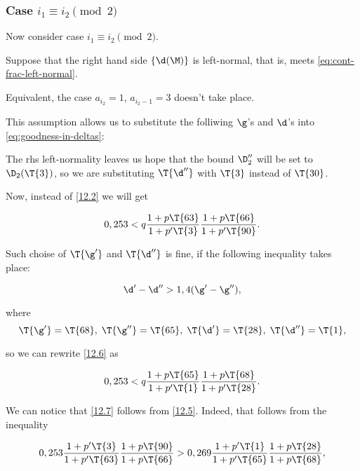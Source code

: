 \subsubsection{Case $i_1 \equiv i_2 \pmod 2$}

Now consider case $i_1 \equiv i_2 \pmod 2$.

Suppose that the right hand side $\{\d(\M)\}$ is left-normal,
that is, meets \ref{eq:cont-frac-left-normal}.

Equivalent, the case $a_{i_2} = 1$, $a_{i_2 - 1} = 3$ doesn't take place.


This assumption allows us to substitute the folliwing $\g$'s and $\d$'s
into \ref{eq:goodness-in-deltas}:
%

The rhs left-normality leaves us hope that the bound $\D_2''$
will be set to $\D_2(\T{3})$,
so we are substituting $\T{\d''}$ with $\T{3}$ instead of $\T{30}$.

Now, instead of \ref{12.2} we will get

\begin{equation}\label{12.5}
	0,253 < q
	\dfrac{1 + p \T{63}}{1 + p' \T{3}}
	\dfrac{1 + p \T{66}}{1 + p' \T{90}}.
\end{equation}

Such choise of $\T{\g'}$ and $\T{\d''}$ is fine,
if the following inequality takes place:

\begin{equation}\label{12.6}
	\d' - \d'' > 1,4 (\g' - \g''),
\end{equation}

where 
\begin{equation*}
	\T{\g'} = \T{68},\;
	\T{\g''} = \T{65},\;
	\T{\d'} = \T{28},\;
	\T{\d''} = \T{1},
\end{equation*}

so we can rewrite \ref{12.6} as

\begin{equation}\label{12.7}
	0,253 < q
	\dfrac{1 + p \T{65}}{1 + p' \T{1}}
	\dfrac{1 + p \T{68}}{1 + p' \T{28}}.
\end{equation}

We can notice that \ref{12.7} follows from \ref{12.5}. Indeed, that follows from the inequality

\begin{equation*}
	0,253
	\dfrac{1 + p' \T{3}}{1 + p' \T{63}}
	\dfrac{1 + p \T{90}}{1 + p \T{66}}
	>
	0,269
	\dfrac{1 + p' \T{1}}{1 + p' \T{65}}
	\dfrac{1 + p \T{28}}{1 + p \T{68}},
\end{equation*}

